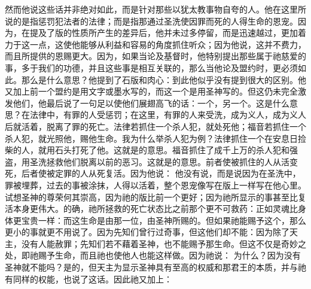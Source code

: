 \par

然而他说这些话并非绝对如此，而是针对那些以犹太教事物自夸的人。他在这里所说的是指惩罚犯法者的法律；而是指那通过圣洗使因罪而死的人得生命的恩宠。因为，在提及了版的性质所产生的差异后，他并未过多停留，而是迅速越过，更加着力于这一点，这使他能够从利益和容易的角度抓住听众；因为他说，这并不费力，而且所提供的恩赐更大。因为，如果当论及基督时，他特别提出那些属于祂慈爱的事，多于我们的功德，并且这些事是相互关联的，那么当他论及盟约时，更必须如此。那么是什么意思？他提到了石版和肉心：到此他似乎没有提到很大的区别。他又加上前一个盟约是用文字或墨水写的，而这一个是用圣神写的。但这仍未完全激发他们，他最后说了一句足以使他们展翅高飞的话：一个，另一个。这是什么意思？在法律中，有罪的人受惩罚；在这里，有罪的人来受洗，成为义人，成为义人后就活着，脱离了罪的死亡。法律若抓住一个杀人犯，就处死他；福音若抓住一个杀人犯，就光照他，赐他生命。我为什么举杀人犯为例？法律抓住一个在安息日捡柴的人，就用石头打死了他。这就是的意思。福音抓住了成千上万的杀人犯和强盗，用圣洗拯救他们脱离以前的恶习。这就是的意思。前者使被抓住的人从活变死，后者使被定罪的人从死复活。因为他说： 他没有说，而是说因为在圣洗中，罪被埋葬，过去的事被涂抹，人得以活着，整个恩宠像写在版上一样写在他心里。试想圣神的尊荣何其崇高，因为祂的版比前一个更好；因为祂所显示的事甚至比复活本身更伟大。的确，祂所拯救的死亡状态比之前那个更不可救药：正如灵魂比身体更宝贵一样：而这生命是由那一位，由圣神所赐的。但如果祂能赐予这个，那么更小的事就更不用说了。因为先知们曾行过奇事，但这他们却不能：因为除了天主，没有人能赦罪；先知们若不藉着圣神，也不能赐予那生命。但这不仅是奇妙之处，即祂赐予生命，而且祂也使他人也能这样做。因为祂说： 为什么？因为没有圣神就不能吗？是的，但天主为显示圣神具有至高的权威和那君王的本质，并与祂有同样的权能，也说了这话。因此祂又加上：\par

